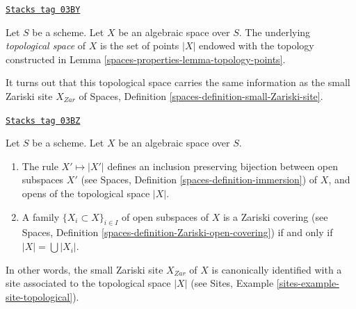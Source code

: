 \begin{definition}
\label{spaces-properties-definition-topological-space}
\href{https://stacks.math.columbia.edu/tag/03BY}{\texttt{Stacks tag 03BY}}

Let $S$ be a scheme. Let $X$ be an algebraic space over $S$.
The underlying {\it topological space} of $X$ is the set of points
$|X|$ endowed with the topology constructed in
Lemma \ref{spaces-properties-lemma-topology-points}.
\end{definition}

It turns out that this topological space carries the same information
as the small Zariski site $X_{Zar}$ of
Spaces, Definition \ref{spaces-definition-small-Zariski-site}.

\begin{lemma}
\label{spaces-properties-lemma-open-subspaces}
\href{https://stacks.math.columbia.edu/tag/03BZ}{\texttt{Stacks tag 03BZ}}

Let $S$ be a scheme.
Let $X$ be an algebraic space over $S$.
\begin{enumerate}
\item The rule $X' \mapsto |X'|$ defines an inclusion preserving
bijection between open subspaces $X'$ (see
Spaces, Definition \ref{spaces-definition-immersion})
of $X$, and opens of the topological space $|X|$.
\item A family $\{X_i \subset X\}_{i \in I}$ of open subspaces of $X$
is a Zariski covering (see
Spaces, Definition \ref{spaces-definition-Zariski-open-covering})
if and only if $|X| = \bigcup |X_i|$.
\end{enumerate}
In other words, the small Zariski site $X_{Zar}$ of $X$ is canonically
identified with a site associated to the topological space $|X|$ (see
Sites, Example \ref{sites-example-site-topological}).
\end{lemma}

